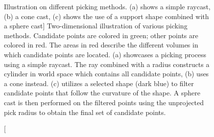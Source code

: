 \begin{figure}[p]
\centering
{}\par\medskip
{}\par\medskip        
{}
\caption
[Illustration on different picking methods. (a) shows a simple raycast, (b) a cone cast, (c) shows the use of a support shape combined with a sphere cast]
{Two-dimensional illustration of various picking methods. Candidate points are colored in green; other points are colored in red. The areas in red describe the different volumes in which candidate points are located. (a) showcases a picking process using a simple raycast. The ray combined with a radius constructs a cylinder in world space which contains all candidate points, (b) uses a cone instead. (c) utilizes a selected shape (dark blue) to filter candidate points that follow the curvature of the shape. A sphere cast is then performed on the filtered points using the unprojected pick radius to obtain the final set of candidate points. }
\label{fig:picking_overview}
\end{figure}

